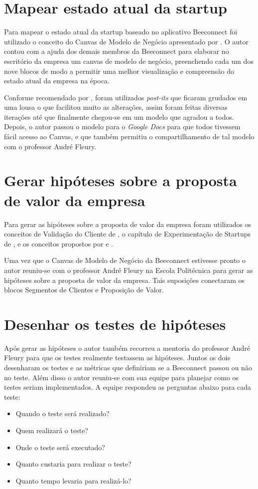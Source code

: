 \section{Mapear estado atual da startup}
\label{cha:mapear_estado}
Para mapear o estado atual da startup baseado no aplicativo Beeconnect foi utilizado o conceito do Canvas de Modelo de Negócio apresentado por .
O autor contou com a ajuda dos demais membros da Beeconnect para elaborar no escritório da empresa um canvas de modelo de negócio, preenchendo cada um dos nove blocos de modo a permitir uma melhor visualização e compreensão do estado atual da empresa na época. 

Conforme recomendado por  , foram utilizados \textit{post-its} que ficaram grudados em uma lousa o que facilitou muito as alterações, assim foram feitas diversas iterações até que finalmente chegou-se em um modelo que agradou a todos. Depois, o autor passou o modelo para o \textit{Google Docs} para que todos tivessem fácil acesso ao Canvas, e que também permitiu o compartilhamento de tal modelo com o professor André Fleury.

\section{Gerar hipóteses sobre a proposta de valor da empresa}
\label{cha:gerar_hipoteses}
Para gerar as hipóteses sobre a proposta de valor da empresa foram utilizados os conceitos de Validação do Cliente de , o capítulo de Experimentação de Startups de , e os conceitos propostos por  e .    

Uma vez que o Canvas de Modelo de Negócio da Beeconnect estivesse pronto o autor reuniu-se com o professor André Fleury na Escola Politécnica para gerar as hipóteses sobre a proposta de valor da empresa. Tais suposições conectaram os blocos Segmentos de Clientes e Proposição de Valor.

\section{Desenhar os testes de hipóteses}
\label{cha:desenhar_hipoteses}
Após gerar as hipóteses o autor também recorreu a mentoria do professor André Fleury para que os testes realmente testassem as hipóteses. Juntos os dois desenharam os testes e as métricas que definiriam se a Beeconnect passou ou não no teste. 
Além disso o autor reuniu-se com sua equipe para planejar como os testes seriam implementados. A equipe respondeu as perguntas abaixo para cada teste:
\begin{itemize}
\item Quando o teste será realizado?
\item Quem realizará o teste?
\item Onde o teste será executado?
\item Quanto custaria para realizar o teste?
\item Quanto tempo levaria para realizá-lo?
\end{itemize}

